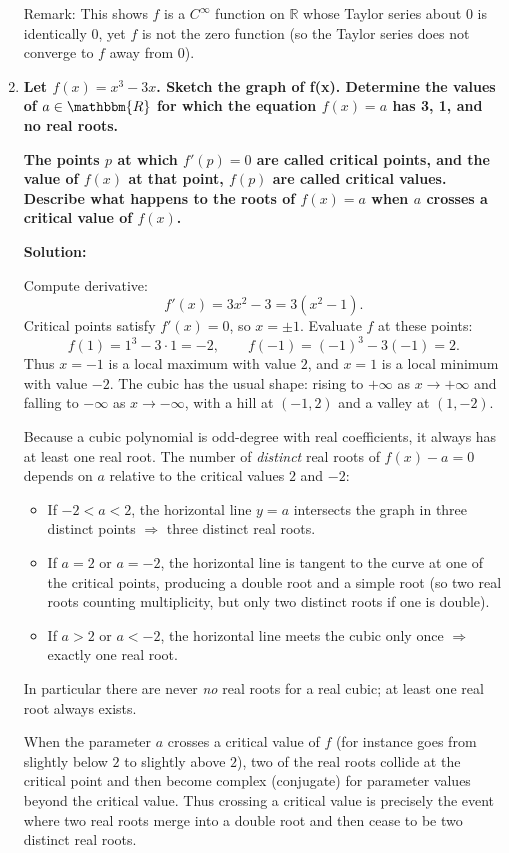 \documentclass[14pt]{extarticle}
\begin{document}
\begin{enumerate}
Remark: This shows $f$ is a $C^{\infty}$ function on $\mathbb R$ whose Taylor series about $0$ is identically $0$, yet $f$ is not the zero function (so the Taylor series does not converge to $f$ away from $0$).

\newpage
\item \textbf{Let $f(x)=x^3-3x$. Sketch the graph of f(x). Determine the values of $a \in \mathbbm{R}$ for which the equation $f(x) = a$ has 3, 1, and no real roots.}

\textbf{The points $p$ at which $f'(p) = 0$ are called critical points, and the value of $f(x)$ at that point, $f(p)$ are called critical values. Describe what happens to the roots of $f(x)=a$ when $a$ crosses a critical value of $f(x)$.}

\textbf{Solution:}

Compute derivative:
\[
f'(x)=3x^2-3=3(x^2-1).
\]
Critical points satisfy $f'(x)=0$, so $x=\pm1$. Evaluate $f$ at these points:
\[ f(1)=1^3-3\cdot1=-2, \qquad f(-1)=(-1)^3-3(-1)=2. \]
Thus $x=-1$ is a local maximum with value $2$, and $x=1$ is a local minimum with value $-2$. The cubic has the usual shape: rising to $+\infty$ as $x\to+\infty$ and falling to $-\infty$ as $x\to-\infty$, with a hill at $(-1,2)$ and a valley at $(1,-2)$.

Because a cubic polynomial is odd-degree with real coefficients, it always has at least one real root. The number of \emph{distinct} real roots of $f(x)-a=0$ depends on $a$ relative to the critical values $2$ and $-2$:
\begin{itemize}
\item If $-2<a<2$, the horizontal line $y=a$ intersects the graph in three distinct points $\Rightarrow$ three distinct real roots.
\item If $a=2$ or $a=-2$, the horizontal line is tangent to the curve at one of the critical points, producing a double root and a simple root (so two real roots counting multiplicity, but only two distinct roots if one is double).
\item If $a>2$ or $a<-2$, the horizontal line meets the cubic only once $\Rightarrow$ exactly one real root.
\end{itemize}

In particular there are never \emph{no} real roots for a real cubic; at least one real root always exists.

When the parameter $a$ crosses a critical value of $f$ (for instance goes from slightly below $2$ to slightly above $2$), two of the real roots collide at the critical point and then become complex (conjugate) for parameter values beyond the critical value. Thus crossing a critical value is precisely the event where two real roots merge into a double root and then cease to be two distinct real roots.


\end{enumerate}
\end{document}
